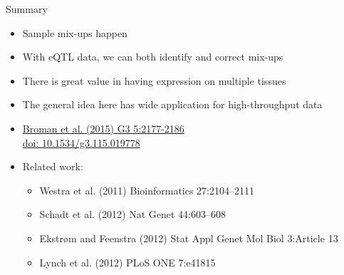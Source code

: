 \documentclass[12pt,t]{beamer}
\begin{document}
\begin{frame}[c]{Summary}


\small
\begin{itemize}
\itemsep3pt

\item Sample mix-ups happen


\item With eQTL data, we can both identify and {\hilit correct} mix-ups

\item There is great value in having expression on multiple tissues

\item The general idea here has wide application for high-throughput data

\item \href{https://www.ncbi.nlm.nih.gov/pubmed/26290572}{Broman et
  al. (2015) G3 5:2177-2186} \\
\href{http://doi.org/10.1534/g3.115.019778}{doi: 10.1534/g3.115.019778}

\item Related work:

\begin{itemize}
\item Westra et al. (2011) Bioinformatics 27:2104--2111
\item Schadt et al. (2012) Nat Genet 44:603--608
\item Ekstr{\o}m and Feenstra (2012) Stat Appl Genet Mol Biol
  3:Article 13
\item Lynch et al. (2012) PLoS ONE 7:e41815
\end{itemize}

\end{itemize}
\note{}
\end{frame}
\end{document}

